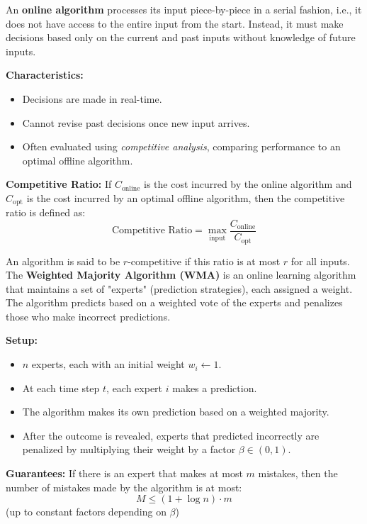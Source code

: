 \documentclass[a4paper,landscape]{article}
\begin{document}
\begin{multicols}{7}
\tcolorbox[mybox={Online Algorithms}]
An \textbf{online algorithm} processes its input piece-by-piece in a serial fashion, i.e., it does not have access to the entire input from the start. Instead, it must make decisions based only on the current and past inputs without knowledge of future inputs.


\textbf{Characteristics:}
\begin{itemize}[noitemsep, topsep=0pt]
    \item Decisions are made in real-time.
    \item Cannot revise past decisions once new input arrives.
    \item Often evaluated using \textit{competitive analysis}, comparing performance to an optimal offline algorithm.
\end{itemize}
\textbf{Competitive Ratio:}  
If $C_{\text{online}}$ is the cost incurred by the online algorithm and $C_{\text{opt}}$ is the cost incurred by an optimal offline algorithm, then the competitive ratio is defined as:
\[
\text{Competitive Ratio} = \max_{\text{input}} \frac{C_{\text{online}}}{C_{\text{opt}}}
\]

An algorithm is said to be $r$-competitive if this ratio is at most $r$ for all inputs.
\endtcolorbox
\tcolorbox[mybox={Weighted Majority Algorithm}]
The \textbf{Weighted Majority Algorithm (WMA)} is an online learning algorithm that maintains a set of "experts" (prediction strategies), each assigned a weight. The algorithm predicts based on a weighted vote of the experts and penalizes those who make incorrect predictions.


\textbf{Setup:}
\begin{itemize}[noitemsep, topsep=0pt]
    \item $n$ experts, each with an initial weight $w_i \gets 1$.
    \item At each time step $t$, each expert $i$ makes a prediction.
    \item The algorithm makes its own prediction based on a weighted majority.
    \item After the outcome is revealed, experts that predicted incorrectly are penalized by multiplying their weight by a factor $\beta \in (0, 1)$.
\end{itemize}


\textbf{Guarantees:}  
If there is an expert that makes at most $m$ mistakes, then the number of mistakes made by the algorithm is at most:
\[
M \leq (1 + \log n) \cdot m
\]
(up to constant factors depending on $\beta$)



\end{multicols}
\end{document}
